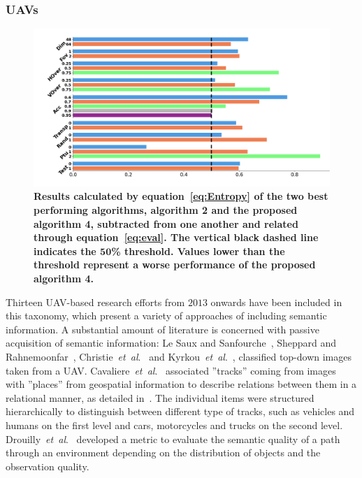 \documentclass[twocolumn,letterpaper]{IEEEAerospaceCLS}  %
\newcommand{\abbreviation}[1]{\emph{#1}.}
\newcommand{\etal}{\abbreviation{et~al}}
\begin{document}
\subsubsection{UAVs} \label{sssec:ResLitUAV}
\begin{figure}[t]
    \centering
    \includegraphics[width=\textwidth]{Results-15.png}
    \caption{\bf{
        Results calculated by equation~\ref{eq:Entropy} of the two best performing algorithms, algorithm 2 and the proposed algorithm 4, subtracted from one another and related through equation~\ref{eq:eval}. The vertical black dashed line indicates the $\mathbf{50}$\% threshold. Values lower than the threshold represent a worse performance of the proposed algorithm 4.
    }}
    \label{fig:Res}
\end{figure}
Thirteen UAV-based research efforts from $2013$ onwards have been included in this taxonomy, which present a variety of approaches of including semantic information. A substantial amount of literature is concerned with passive acquisition of semantic information: 
Le Saux and Sanfourche~\cite{saux_rapid_2013}, Sheppard and Rahnemoonfar~\cite{sheppard_real-time_2017}, Christie~\etal~\cite{christie_semantics_2016} and Kyrkou~\etal~\cite{kyrkou_dronet:_2018}, classified top-down images taken from a UAV. Cavaliere~\etal~\cite{cavaliere_towards_2016,cavaliere_towards_2018} associated ''tracks'' coming from images with ''places'' from geospatial information to describe relations between them in a relational manner, as detailed in~\cite{landsiedel_review_2017}. The individual items were structured hierarchically to distinguish between different type of tracks, such as vehicles and humans on the first level and cars, motorcycles and trucks on the second level. Drouilly~\etal~\cite{drouilly_semantic_2015} developed a metric to evaluate the semantic quality of a path through an environment depending on the distribution of objects and the observation quality.
\end{document}
